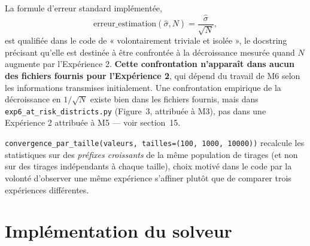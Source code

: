 \documentclass[11pt,a4paper]{article}
\begin{document}
La formule d'erreur standard implémentée,
\begin{equation}
  \text{erreur\_estimation}(\hat{\sigma}, N) = \frac{\hat{\sigma}}{\sqrt{N}},
\end{equation}
est qualifiée dans le code de « volontairement triviale et isolée », le
docstring précisant qu'elle est destinée à être confrontée à la décroissance
mesurée quand $N$ augmente par l'Expérience 2. \textbf{Cette confrontation
n'apparaît dans aucun des fichiers fournis pour l'Expérience 2}, qui dépend
du travail de M6 selon les informations transmises initialement. Une
confrontation empirique de la décroissance en $1/\sqrt{N}$ existe bien dans
les fichiers fournis, mais dans \texttt{exp6\_at\_risk\_districts.py}
(Figure~3, attribuée à M3), pas dans une Expérience 2 attribuée à M5 --- voir
section~15.

\texttt{convergence\_par\_taille(valeurs, tailles=(100, 1000, 10000))}
recalcule les statistiques sur des \emph{préfixes croissants} de la même
population de tirages (et non sur des tirages indépendants à chaque taille),
choix motivé dans le code par la volonté d'observer une même expérience
s'affiner plutôt que de comparer trois expériences différentes.

\section{Implémentation du solveur}
\end{document}
